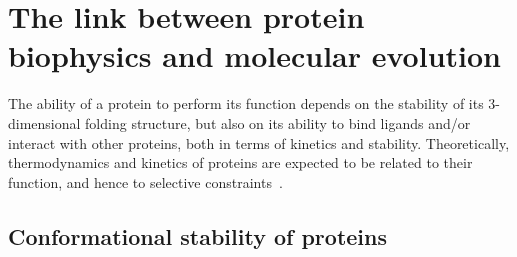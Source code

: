 \section{The link between protein biophysics and molecular evolution}
\label{sec:intro-protein-biophysics}

The ability of a protein to perform its function depends on the stability of its 3-dimensional folding structure, but also on its ability to bind ligands and/or interact with other proteins, both in terms of kinetics and stability.
Theoretically, thermodynamics and kinetics of proteins are expected to be related to their function, and hence to selective constraints~\citep{Bastolla2017}.

\subsection{Conformational stability of proteins}

